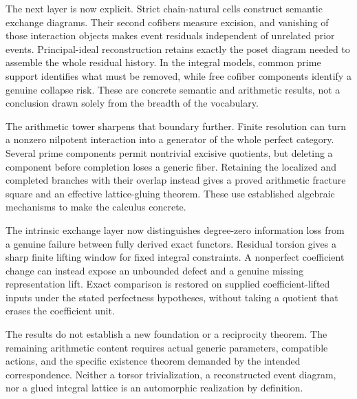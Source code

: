 \documentclass[11pt]{article}
\theoremstyle{definition}
\theoremstyle{remark}
\begin{document}
The next layer is now explicit. Strict chain-natural cells construct semantic exchange diagrams. Their second cofibers measure excision, and vanishing of those interaction objects makes event residuals independent of unrelated prior events. Principal-ideal reconstruction retains exactly the poset diagram needed to assemble the whole residual history. In the integral models, common prime support identifies what must be removed, while free cofiber components identify a genuine collapse risk. These are concrete semantic and arithmetic results, not a conclusion drawn solely from the breadth of the vocabulary.

The arithmetic tower sharpens that boundary further. Finite resolution can turn a nonzero nilpotent interaction into a generator of the whole perfect category. Several prime components permit nontrivial excisive quotients, but deleting a component before completion loses a generic fiber. Retaining the localized and completed branches with their overlap instead gives a proved arithmetic fracture square and an effective lattice-gluing theorem. These use established algebraic mechanisms to make the calculus concrete.

The intrinsic exchange layer now distinguishes degree-zero information loss from a genuine failure between fully derived exact functors. Residual torsion gives a sharp finite lifting window for fixed integral constraints. A nonperfect coefficient change can instead expose an unbounded defect and a genuine missing representation lift. Exact comparison is restored on supplied coefficient-lifted inputs under the stated perfectness hypotheses, without taking a quotient that erases the coefficient unit.

The results do not establish a new foundation or a reciprocity theorem. The remaining arithmetic content requires actual generic parameters, compatible actions, and the specific existence theorem demanded by the intended correspondence. Neither a torsor trivialization, a reconstructed event diagram, nor a glued integral lattice is an automorphic realization by definition.
\end{document}
